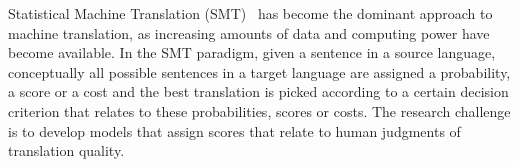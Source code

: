 




Statistical Machine Translation (SMT)~\citep{brown-dellapietra-dellapietra-mercer-1993,lopez:2008:ACMComputingSurveys,koehn:2010:book}
has become the dominant approach to machine translation, as increasing
amounts of data and computing power have become available.
In the SMT paradigm, given a sentence in a source language,
conceptually all
possible sentences in a target language are assigned a probability, a
score or a cost and the best translation is picked according to a certain
decision criterion that relates to these probabilities, scores or costs.
The research challenge is to develop models that assign scores that
relate to human judgments of translation quality.


